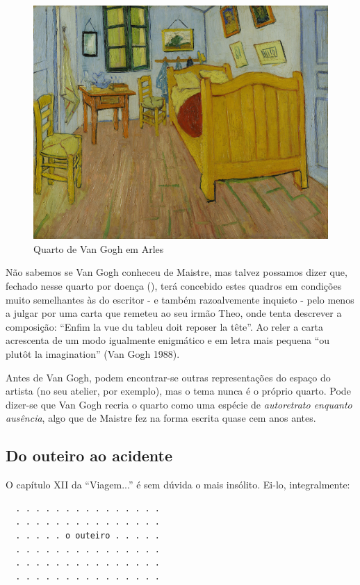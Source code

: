 \documentclass[12pt]{article}
\begin{document}
\begin{figure}
  \label{fig:1}
  \centering\includegraphics[height=0.6\textheight,keepaspectratio] {slaapkamer.jpg}
  \caption{Quarto de Van Gogh em Arles}
\end{figure}

Não sabemos se Van Gogh conheceu de Maistre, mas talvez possamos dizer
que, fechado nesse quarto por doença (\cite{goghroom}), terá concebido
estes quadros em condições muito semelhantes às do escritor - e também
razoalvemente inquieto - pelo menos a julgar por uma carta que remeteu
ao seu irmão Theo, onde tenta descrever a composição: ``Enfim la vue
du tableu doit reposer la tête''. Ao reler a carta acrescenta de um
modo igualmente enigmático e em letra mais pequena ``ou plutôt la
imagination'' (Van Gogh 1988).

Antes de Van Gogh, podem encontrar-se outras representações do espaço
do artista (no seu atelier, por exemplo), mas o tema nunca é o próprio
quarto. Pode dizer-se que Van Gogh recria o quarto como uma espécie de
\emph{autoretrato enquanto ausência}, algo que de Maistre fez na forma
escrita quase cem anos antes.

\subsection{Do outeiro ao acidente}

O capítulo XII da ``Viagem...'' é sem dúvida o mais insólito. Ei-lo,
integralmente:

\begin{verbatim}
  . . . . . . . . . . . . . . .
  . . . . . . . . . . . . . . .
  . . . . . o outeiro . . . . .
  . . . . . . . . . . . . . . .
  . . . . . . . . . . . . . . .
  . . . . . . . . . . . . . . .
\end{verbatim}
\end{document}

